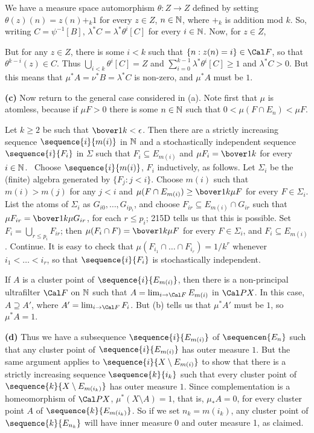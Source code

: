 {\medskip

We have a measure space automorphism $\theta:Z\to Z$ defined by setting
$\theta(z)(n)=z(n)+_k1$ for every $z\in Z$, $n\in\Bbb N$, where $+_k$
is addition mod $k$.   So, writing $C=\psi^{-1}[B]$,
$\lambda^*C=\lambda^*\theta^i[C]$ for every $i\in\Bbb N$.   Now, for
$z\in Z$,


\noindent But for any $z\in Z$, there is some $i<k$ such that
$\{n:z(n)=i\}\in\Cal F$, so that $\theta^{k-i}(z)\in C$.   Thus
$\bigcup_{i<k}\theta^i[C]=Z$ and
$\sum_{i=0}^{k-1}\lambda^*\theta^i[C]\ge 1$ and $\lambda^*C>0$.   But
this means that $\mu^*A=\nu^*B=\lambda^*C$ is non-zero, and $\mu^*A$
must be $1$.\ \Qed

\medskip

{\bf (c)} Now return to the general case considered in (a).   Note first
that $\mu$ is atomless, because if $\mu F>0$ there is some $n\in\Bbb N$
such that $0<\mu(F\cap E_n)<\mu F$.

Let $k\ge 2$ be such that $\bover1k<\epsilon$.   Then there are a
strictly increasing sequence $\sequence{i}{m(i)}$ in $\Bbb N$ and a
stochastically independent sequence $\sequence{i}{F_i}$ in $\Sigma$ such
that $F_i\subseteq E_{m(i)}$ and $\mu F_i=\bover1k$ for every
$i\in\Bbb N$.   \Prf\ Choose $\sequence{i}{m(i)}$, $F_i$ inductively, as
follows.   Let $\Sigma_i$ be the (finite) algebra generated by
$\{F_j:j<i\}$.   Choose $m(i)$ such that $m(i)>m(j)$ for any $j<i$ and
$\mu(F\cap E_{m(i)})\ge\bover1k\mu F$ for every $F\in\Sigma_i$.   List
the atoms of $\Sigma_i$ as $G_{i0},\ldots,G_{ip_i}$, and choose
$F_{ir}\subseteq E_{m(i)}\cap G_{ir}$ such that
$\mu F_{ir}=\bover1k\mu G_{ir}$, for each
$r\le p_i$;  215D tells us that this is possible.   Set
$F_i=\bigcup_{r\le p_i}F_{ir}$;  then $\mu(F_i\cap F)=\bover1k\mu F$ for
every $F\in\Sigma_i$, and $F_i\subseteq E_{m(i)}$.   Continue.
It is easy to check that $\mu(F_{i_1}\cap\ldots\cap F_{i_r})=1/k^r$
whenever $i_1<\ldots<i_r$, so that $\sequence{i}{F_i}$ is stochastically
independent.\ \Qed

If $A$ is a cluster point of $\sequence{i}{E_{m(i)}}$, then there is a
non-principal ultrafilter $\Cal F$ on $\Bbb N$ such that
$A=\lim_{i\to\Cal F}E_{m(i)}$ in $\Cal PX$.   In this case,
$A\supseteq A'$, where $A'=\lim_{i\to\Cal F}F_i$.
But (b) tells us that $\mu^*A'$
must be $1$, so $\mu^*A=1$.

\medskip

{\bf (d)} Thus we have a subsequence $\sequence{i}{E_{m(i)}}$ of
$\sequencen{E_n}$ such that any cluster point of
$\sequence{i}{E_{m(i)}}$ has outer measure $1$.   But the same argument
applies to $\sequence{i}{X\setminus E_{m(i)}}$ to show that there is a
strictly increasing sequence $\sequence{k}{i_k}$ such that every cluster
point of $\sequence{k}{X\setminus E_{m(i_k)}}$ has outer measure $1$.
Since complementation is a homeomorphism of $\Cal PX$, $\mu^*(X\setminus
A)=1$, that is, $\mu_*A=0$, for every cluster point $A$ of
$\sequence{k}{E_{m(i_k)}}$.   So if we set $n_k=m(i_k)$, any cluster
point of $\sequence{k}{E_{n_k}}$ will have inner measure 0 and outer
measure 1, as claimed.
}%

